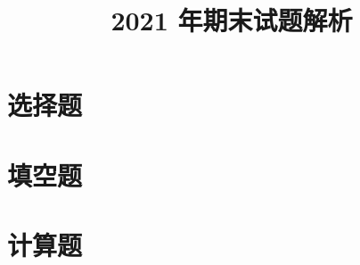 \documentclass[cn,hazy,blue,12pt,normal, math=newtx]{elegantnote}
\title{2021 年期末试题解析 }
\author{}
\institute{彭康学导团}
\date{}
\begin{document}
\maketitle

\newpage
\section{选择题}





\section{填空题}





\section{计算题}








\end{document}
